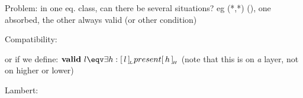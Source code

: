 Problem: in one eq. class, can there be several situations? eg (*,*) \dbarr (), one absorbed, the other always valid (or other condition)

Compatibility:

or if we define: ${\bf valid}~l \eqv \exists h : \eqcl{l}{L} present \eqcl{h}{H}$ (note that this is on {\em a} layer, not on higher or lower)


Lambert:







